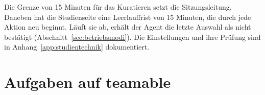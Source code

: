 Die Grenze von 15 Minuten für das Kuratieren setzt die Sitzungsleitung. Daneben hat die Studienseite eine Leerlauffrist von 15 Minuten, die durch jede Aktion neu beginnt. Läuft sie ab, erhält der Agent die letzte Auswahl als nicht bestätigt (Abschnitt~\ref{sec:betriebsmodi}). Die Einstellungen und ihre Prüfung sind in Anhang~\ref{app:studientechnik} dokumentiert.

\section{Aufgaben auf teamable}%
\label{sec:aufgaben}
%
%
